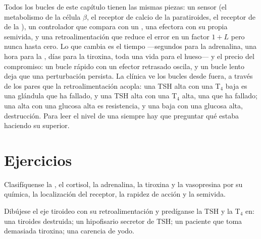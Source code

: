 \begin{remark}\label{rem:b3:endocrinology:control}
Todos los bucles de este capítulo tienen las mismas piezas: un sensor
(el metabolismo de la célula $\beta$, el receptor de calcio de la
paratiroides, el receptor de  de la ), un
controlador que compara con un , una  efectora
con su propia semivida, y una retroalimentación que reduce el error en
un factor $1 + L$ pero nunca hasta cero. Lo que cambia es el tiempo
---segundos para la adrenalina, una hora para la , días para la
tiroxina, toda una vida para el hueso--- y el precio del compromiso: un
bucle rápido con un efector retrasado oscila, y un bucle lento deja que
una perturbación persista. La clínica ve los bucles desde fuera, a
través de los pares que la retroalimentación acopla: una TSH alta con
una T$_{4}$ baja es una glándula que ha fallado, y una TSH alta con una
T$_{4}$ alta, una  que ha fallado; una  alta con una
glucosa alta es resistencia, y una  baja con una glucosa alta,
destrucción. Para leer el nivel de una  siempre hay que
preguntar qué estaba haciendo su superior.
\end{remark}

\section{Ejercicios}

\begin{exercise}[$\star$]\label{exo:b3:endocrinology:1}
Clasifíquense la , el cortisol, la adrenalina, la tiroxina y la
vasopresina por su química, la localización del receptor, la rapidez de
acción y la semivida.
\end{exercise}

\begin{exercise}[$\star$]\label{exo:b3:endocrinology:2}
Dibújese el eje tiroideo con su retroalimentación y predíganse la TSH y
la T$_{4}$ en: una tiroides destruida; un  hipofisario secretor de
TSH; un paciente que toma demasiada tiroxina; una carencia de yodo.
\end{exercise}

